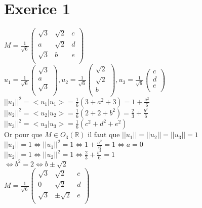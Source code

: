 \documentclass{article}
\author{Frederic Becerril}
\begin{document}
\part*{Exerice 1}

$M = \frac{1}{\sqrt{6}} \begin{pmatrix}
    \sqrt{3} & \sqrt{2} & c\\
    a & \sqrt{2} & d\\
    \sqrt{3} & b & e\\
\end{pmatrix}$\\
$u_1 = \frac{1}{\sqrt{6}}\begin{pmatrix}
    \sqrt{3}\\
    a\\
    \sqrt{3}\\
\end{pmatrix}, u_2 = \frac{1}{\sqrt{6}} \begin{pmatrix}
    \sqrt{2}\\
    \sqrt{2}\\
    b\\
\end{pmatrix}, u_3 = \frac{1}{\sqrt{6}} \begin{pmatrix}
    c\\
    d\\
    e\\
\end{pmatrix}$\\
$||u_1||^2 = <u_1|u_1> = \frac{1}{6}(3 + a^2 + 3) = 1 + \frac{a^2}{6}$\\
$||u_2||^2 = <u_2|u_2> = \frac{1}{6}(2 + 2 + b^2) = \frac{2}{3} + \frac{b^2}{6}$\\
$||u_3||^2 = <u_3|u_3> = \frac{1}{6}(c^2 + d^2 + e^2)$\\
Or pour que $M \in O_3(\mathbb{R})$ il faut que $||u_1|| = ||u_2|| = ||u_3|| = 1$\\
$||u_1|| = 1 \Leftrightarrow ||u_1||^2 = 1 \Leftrightarrow 1 + \frac{a^2}{6} = 1 \Leftrightarrow a = 0$\\
$||u_2|| = 1 \Leftrightarrow ||u_2||^2 = 1 \Leftrightarrow \frac{2}{3} + \frac{b^2}{6} = 1$\\
$\Leftrightarrow b^2 = 2 \Leftrightarrow b \pm \sqrt{2}$\\
$M = \frac{1}{\sqrt{6}} \begin{pmatrix}
    \sqrt{3} & \sqrt{2} & c\\
    0 & \sqrt{2} & d\\
    \sqrt{3} & \pm \sqrt{2} & e\\
\end{pmatrix}$\\
\end{document}
